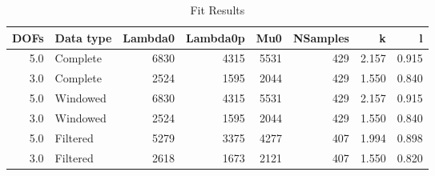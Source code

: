 \begin{table}
\centering
\caption{Fit Results}
\begin{tabular}{rlrrrrrr}
\toprule
 DOFs & Data type &  Lambda0 &  Lambda0p &   Mu0 &  NSamples &      k &      l \\
\midrule
  5.0 &  Complete &     6830 &      4315 &  5531 &       429 &  2.157 &  0.915 \\
  3.0 &  Complete &     2524 &      1595 &  2044 &       429 &  1.550 &  0.840 \\
  5.0 &  Windowed &     6830 &      4315 &  5531 &       429 &  2.157 &  0.915 \\
  3.0 &  Windowed &     2524 &      1595 &  2044 &       429 &  1.550 &  0.840 \\
  5.0 &  Filtered &     5279 &      3375 &  4277 &       407 &  1.994 &  0.898 \\
  3.0 &  Filtered &     2618 &      1673 &  2121 &       407 &  1.550 &  0.820 \\
\bottomrule
\end{tabular}
\end{table}
